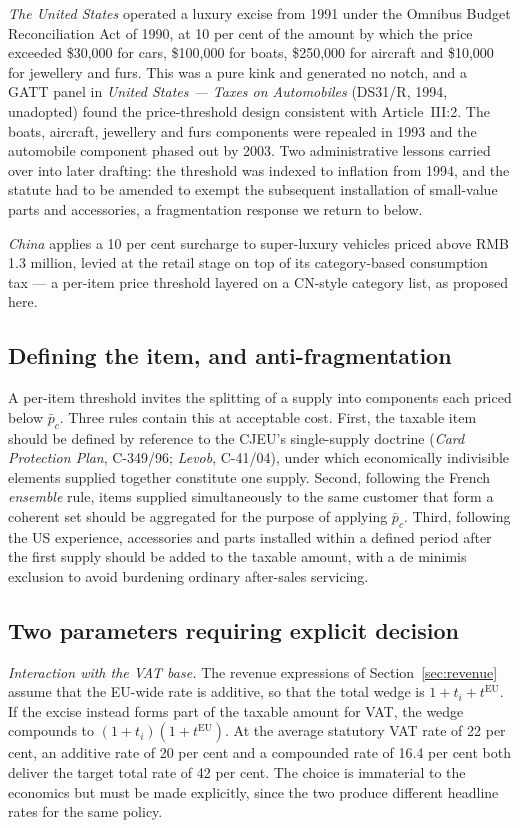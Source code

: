 \emph{The United States} operated a luxury excise from 1991 under the Omnibus Budget Reconciliation
Act of 1990, at 10 per cent of the amount by which the price exceeded \$30{,}000 for cars,
\$100{,}000 for boats, \$250{,}000 for aircraft and \$10{,}000 for jewellery and furs. This was a
pure kink and generated no notch, and a GATT panel in \emph{United States --- Taxes on Automobiles}
(DS31/R, 1994, unadopted) found the price-threshold design consistent with Article~III:2. The
boats, aircraft, jewellery and furs components were repealed in 1993 and the automobile component
phased out by 2003. Two administrative lessons carried over into later drafting: the threshold was
indexed to inflation from 1994, and the statute had to be amended to exempt the subsequent
installation of small-value parts and accessories, a fragmentation response we return to below.

\emph{China} applies a 10 per cent surcharge to super-luxury vehicles priced above RMB 1.3 million,
levied at the retail stage on top of its category-based consumption tax --- a per-item price
threshold layered on a CN-style category list, as proposed here.

\subsection{Defining the item, and anti-fragmentation}
\label{sec:item}

A per-item threshold invites the splitting of a supply into components each priced below
$\bar{p}_c$. Three rules contain this at acceptable cost. First, the taxable item should be defined
by reference to the CJEU's single-supply doctrine (\emph{Card Protection Plan}, C-349/96;
\emph{Levob}, C-41/04), under which economically indivisible elements supplied together constitute
one supply. Second, following the French \emph{ensemble} rule, items supplied simultaneously to the
same customer that form a coherent set should be aggregated for the purpose of applying
$\bar{p}_c$. Third, following the US experience, accessories and parts installed within a defined
period after the first supply should be added to the taxable amount, with a de minimis exclusion to
avoid burdening ordinary after-sales servicing.

\subsection{Two parameters requiring explicit decision}

\emph{Interaction with the VAT base.} The revenue expressions of Section~\ref{sec:revenue} assume
that the EU-wide rate is additive, so that the total wedge is $1 + t_i + t^{\mathrm{EU}}$. If the
excise instead forms part of the taxable amount for VAT, the wedge compounds to
$(1+t_i)(1+t^{\mathrm{EU}})$. At the average statutory VAT rate of 22 per cent, an additive rate of
20 per cent and a compounded rate of 16.4 per cent both deliver the target total rate of 42 per
cent. The choice is immaterial to the economics but must be made explicitly, since the two produce
different headline rates for the same policy.

